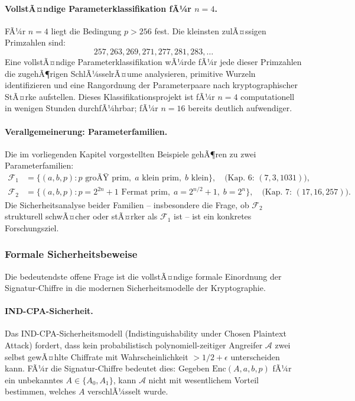 ﻿\documentclass[a4paper,12pt]{scrreprt}
\theoremstyle{definition}
\begin{document}
\paragraph{VollstÃ¤ndige Parameterklassifikation fÃ¼r $n = 4$.}
FÃ¼r $n = 4$ liegt die Bedingung $p > 256$ fest. Die kleinsten zulÃ¤ssigen Primzahlen sind:
\[
257, 263, 269, 271, 277, 281, 283, \ldots
\]
Eine vollstÃ¤ndige Parameterklassifikation wÃ¼rde fÃ¼r jede dieser Primzahlen die zugehÃ¶rigen SchlÃ¼sselrÃ¤ume analysieren, primitive Wurzeln identifizieren und eine Rangordnung der Parameterpaare nach kryptographischer StÃ¤rke aufstellen. Dieses Klassifikationsprojekt ist fÃ¼r $n=4$ computationell in wenigen Stunden durchfÃ¼hrbar; fÃ¼r $n=16$ bereits deutlich aufwendiger.

\paragraph{Verallgemeinerung: Parameterfamilien.}
Die im vorliegenden Kapitel vorgestellten Beispiele gehÃ¶ren zu zwei Parameterfamilien:
\begin{align*}
\mathcal{F}_1 &= \{(a, b, p) : p \text{ groÃŸ prim},\; a \text{ klein prim},\; b \text{ klein}\}, \quad \text{(Kap.~6: $(7,3,1031)$)},\\
\mathcal{F}_2 &= \{(a, b, p) : p = 2^{2n}+1 \text{ Fermat prim},\; a = 2^{n/2}+1,\; b = 2^n\}, \quad \text{(Kap.~7: $(17,16,257)$)}.
\end{align*}
Die Sicherheitsanalyse beider Familien -- insbesondere die Frage, ob $\mathcal{F}_2$ strukturell schwÃ¤cher oder stÃ¤rker als $\mathcal{F}_1$ ist -- ist ein konkretes Forschungsziel.

\subsubsection{Formale Sicherheitsbeweise}

Die bedeutendste offene Frage ist die vollstÃ¤ndige formale Einordnung der Signatur-Chiffre in die modernen Sicherheitsmodelle der Kryptographie.

\paragraph{IND-CPA-Sicherheit.}
Das IND-CPA-Sicherheitsmodell (Indistinguishability under Chosen Plaintext Attack) \cite{GM84} fordert, dass kein probabilistisch polynomiell-zeitiger Angreifer $\mathcal{A}$ zwei selbst gewÃ¤hlte Chiffrate mit Wahrscheinlichkeit $> 1/2 + \epsilon$ unterscheiden kann. FÃ¼r die Signatur-Chiffre bedeutet dies: Gegeben $\mathrm{Enc}(A, a, b, p)$ fÃ¼r ein unbekanntes $A \in \{A_0, A_1\}$, kann $\mathcal{A}$ nicht mit wesentlichem Vorteil bestimmen, welches $A$ verschlÃ¼sselt wurde.
\end{document}
